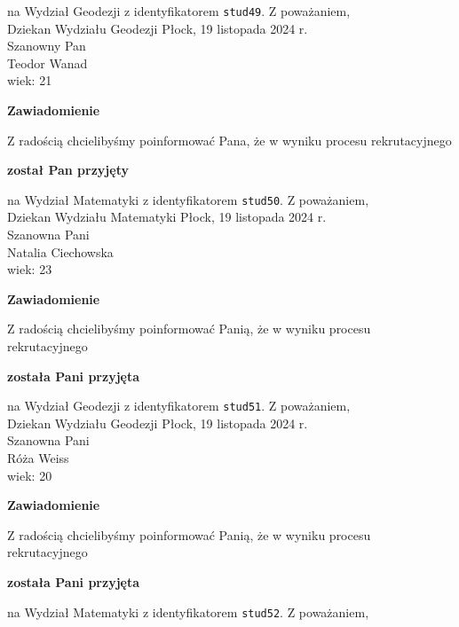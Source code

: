 \documentclass[12pt,a4paper]{article}
\begin{document}
na Wydział Geodezji z identyfikatorem \verb|stud49|. 
\vspace{2cm}
\noindent
Z poważaniem, \\
Dziekan
Wydziału Geodezji
\newpage
\hfill Płock, 19 listopada 2024 r. \\
\noindent
Szanowny Pan \\
Teodor Wanad \\
wiek: 21
\bigskip
\begin{center}
    {\Large\textbf{Zawiadomienie}}
\end{center}
\bigskip 
Z radością chcielibyśmy poinformować Pana, że w wyniku procesu rekrutacyjnego
\begin{center}
\textsf{\textbf{został Pan przyjęty}}
\end{center}
na Wydział Matematyki z identyfikatorem \verb|stud50|. 
\vspace{2cm}
\noindent
Z poważaniem, \\
Dziekan
Wydziału Matematyki
\newpage
\hfill Płock, 19 listopada 2024 r. \\
\noindent
Szanowna Pani \\
Natalia Ciechowska \\
wiek: 23
\bigskip
\begin{center}
    {\Large\textbf{Zawiadomienie}}
\end{center}
\bigskip 
Z radością chcielibyśmy poinformować Panią, że w wyniku procesu rekrutacyjnego
\begin{center}
\textsf{\textbf{została Pani przyjęta}}
\end{center}
na Wydział Geodezji z identyfikatorem \verb|stud51|. 
\vspace{2cm}
\noindent
Z poważaniem, \\
Dziekan
Wydziału Geodezji
\newpage
\hfill Płock, 19 listopada 2024 r. \\
\noindent
Szanowna Pani \\
Róża Weiss \\
wiek: 20
\bigskip
\begin{center}
    {\Large\textbf{Zawiadomienie}}
\end{center}
\bigskip 
Z radością chcielibyśmy poinformować Panią, że w wyniku procesu rekrutacyjnego
\begin{center}
\textsf{\textbf{została Pani przyjęta}}
\end{center}
na Wydział Matematyki z identyfikatorem \verb|stud52|. 
\vspace{2cm}
\noindent
Z poważaniem, \\
\end{document}
